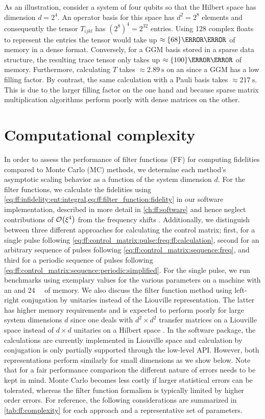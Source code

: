 As an illustration, consider a system of four qubits so that the Hilbert space has dimension $d = 2^4$.
An operator basis for this space has $d^2 = 2^8$ elements and consequently the tensor $T_{ijkl}$ has $(2^8)^4 = 2^{32}$ entries.
Using \qty{128}{\bit} complex floats to represent the entries the tensor would take up $\approx\qty{68}{\giga\byte}$ of memory in a dense format.
Conversely, for a GGM basis stored in a sparse data structure, the resulting trace tensor only takes up $\approx\qty{100}{\mega\byte}$ of memory.
Furthermore, calculating $T$ takes $\approx\qty{2.89}{\second}$ on an \fastprocessor since a GGM has a low filling factor.
By contrast, the same calculation with a Pauli basis takes $\approx\qty{217}{\second}$.
This is due to the larger filling factor on the one hand and because sparse matrix multiplication algorithms perform poorly with dense matrices on the other.

\section{Computational complexity}\label{sec:ff:performance:complexity}
In order to assess the performance of filter functions (FF) for computing fidelities compared to Monte Carlo (MC) methods, we determine each method's asymptotic scaling behavior as a function of the system dimension $d$.
For the filter functions, we calculate the fidelities using \cref{eq:ff:infidelity:ent:integral,eq:ff:filter_function:fidelity} in our software implementation, described in more detail in \cref{ch:ff:software} and hence neglect contributions of $\order{\xi^4}$ from the frequency shifts \freqshifts.
Additionally, we distinguish between three different approaches for calculating the control matrix; first, for a single pulse following \cref{eq:ff:control_matrix:pulse:freq:ff:calculation}, second for an arbitrary sequence of pulses following \cref{eq:ff:control_matrix:sequence:freq}, and third for a periodic sequence of pulses following \cref{eq:ff:control_matrix:sequence:periodic:simplified}.
For the single pulse, we run benchmarks using exemplary values for the various parameters on a machine with an \slowprocessor and \qty{24}{\giga\byte} of memory.
We also discuss the filter function method using left-right conjugation by unitaries instead of the Liouville representation.
The latter has higher memory requirements and is expected to perform poorly for large system dimensions $d$ since one deals with $d^2\times d^2$ transfer matrices on a Liouville space \Lspace instead of $d\times d$ unitaries on a Hilbert space \Hspace.
In the software package, the calculations are currently implemented in Liouville space and calculation by conjugation is only partially supported through the low-level API.
However, both representations perform similarly for small dimensions as we show below.
Note that for a fair performance comparison the different nature of errors needs to be kept in mind.
Monte Carlo becomes less costly if larger statistical errors can be tolerated, whereas the filter function formalism is typically limited by higher order errors.
For reference, the following considerations are summarized in \cref{tab:ff:complexity} for each approach and a representative set of parameters.

